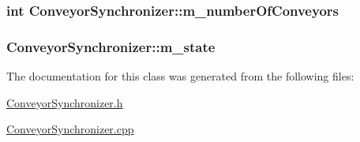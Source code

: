 \hypertarget{classConveyorSynchronizer_a9e4513793155c94c434ab6403c937085}{
\subsubsection[{m\-\_\-number\-Of\-Conveyors}]{\setlength{\rightskip}{0pt plus 5cm}int Conveyor\-Synchronizer\-::m\-\_\-number\-Of\-Conveyors}}\label{classConveyorSynchronizer_a9e4513793155c94c434ab6403c937085}
\hypertarget{classConveyorSynchronizer_a74ead75da9c1863838b34cd288cae02f}{
\subsubsection[{m\-\_\-state}]{ Conveyor\-Synchronizer\-::m\-\_\-state}}\label{classConveyorSynchronizer_a74ead75da9c1863838b34cd288cae02f}


The documentation for this class was generated from the following files\-:\begin{DoxyCompactItemize}
\item 
\hyperlink{ConveyorSynchronizer_8h}{Conveyor\-Synchronizer.\-h}\item 
\hyperlink{ConveyorSynchronizer_8cpp}{Conveyor\-Synchronizer.\-cpp}\end{DoxyCompactItemize}
